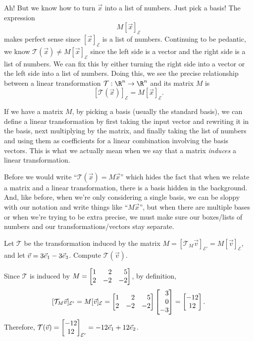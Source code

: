 Ah! But we know how to turn $\vec x$ into a list of numbers. Just pick a basis! The expression
\[
	M[\vec x]_{\mathcal E}
\]
makes perfect sense since $[\vec x]_{\mathcal E}$ is a list of numbers. Continuing to be pedantic, we know
$\mathcal T(\vec x)\neq M[\vec x]_{\mathcal E}$ since the left side is a vector and the right side is a list of numbers.
We can fix this by either turning the right side into a vector or the left side into a list of numbers.
Doing this, we see the precise relationship between a linear transformation $\mathcal T:\R^n\to\R^n$ and its matrix $M$ is
\[
	[\mathcal T(\vec x)]_{\mathcal E}=M[\vec x]_{\mathcal E}.
\]

If we have a matrix $M$, by picking a basis (usually the standard basis),
we can define a linear transformation by first taking the input vector and rewriting it in the basis,
next multiplying by the matrix, and finally taking the list of numbers and using them as coefficients
for a linear combination involving the basis vectors. This is what we actually mean
when we say that a matrix \emph{induces} a linear transformation.


Before we would write ``$\mathcal T(\vec x)=M\vec x$'' which hides the fact that when we relate a matrix and a linear
transformation, there is a basis hidden in the background. And, like before, when we're only considering a single basis,
we can be sloppy with our notation and write things like ``$M\vec x$'', but when there are multiple bases or when we're
trying to be extra precise, we must make sure our boxes/lists of numbers and our transformations/vectors stay separate.

\begin{example}
	Let $\mathcal T$ be the transformation induced by the matrix $M=	[\mathcal T_{M}\vec v]_{\mathcal E'}= M[\vec v]_{\mathcal E}$,
	and let $\vec v=3{\vec e_1}-3{\vec e_3}$. Compute $\mathcal T(\vec v)$.

	Since $\mathcal T$ is induced by $M=\mat{1&2&5\\2&-2&-2}$, by definition, 	
	\[
	    [\mathcal T_{M}\vec v]_{\mathcal E'}= M[\vec v]_{\mathcal E}=\mat{1&2&5\\2&-2&-2}\mat{3\\0\\-3}=\matc{-12\\12}.
	\]
	Therefore, $\mathcal T(\vec v) = \begin{bmatrix}-12\\12\end{bmatrix}_{\mathcal E'}=-12{\vec e_1}+12{\vec e_2}$.
\end{example}

